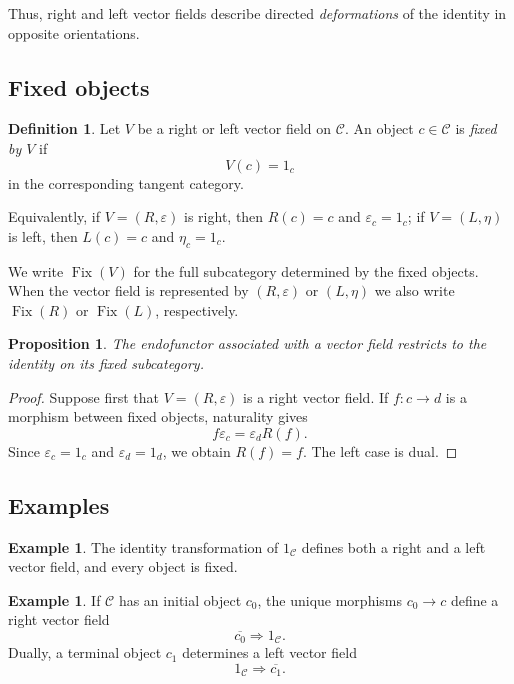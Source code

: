 \documentclass[12pt]{amsart}
\newtheorem{proposition}[teo]{Proposition}
\theoremstyle{definition}
\newtheorem{definition}[teo]{Definition}
\newtheorem{example}[teo]{Example}
\theoremstyle{remark}
\numberwithin{figure}{section}%
\newcommand{\CC}{\mathcal{C}}
\begin{document}
Thus, right and left vector fields describe directed \textit{deformations} of the
identity in opposite orientations.

\subsection{Fixed objects}
\label{subsec:fixed_objects}

\begin{definition}\label{def:fixed_object}
Let \(V\) be a right or left vector field on \(\CC\). An object
\(c\in\CC\) is \emph{fixed by \(V\)} if
\[
V(c)=1_c
\]
in the corresponding tangent category.

Equivalently, if \(V=(R,\varepsilon)\) is right, then
\(R(c)=c\) and \(\varepsilon_c=1_c\); if \(V=(L,\eta)\) is left, then
\(L(c)=c\) and \(\eta_c=1_c\).
\end{definition}

We write \(\operatorname{Fix}(V)\) for the full subcategory determined by
the fixed objects. When the vector field is represented by
\((R,\varepsilon)\) or \((L,\eta)\) we also write
\(\operatorname{Fix}(R)\) or \(\operatorname{Fix}(L)\), respectively.

\begin{proposition}\label{prop:fixed_subcategory}
The endofunctor associated with a vector field restricts to the identity
on its fixed subcategory.
\end{proposition}

\begin{proof}
Suppose first that \(V=(R,\varepsilon)\) is a right vector field. If
\(f\colon c\to d\) is a morphism between fixed objects, naturality gives
\[
f\varepsilon_c=\varepsilon_dR(f).
\]
Since \(\varepsilon_c=1_c\) and \(\varepsilon_d=1_d\), we obtain
\(R(f)=f\). The left case is dual.
\end{proof}

\subsection{Examples}

\begin{example}\label{ex:identity_vector_field}
The identity transformation of \(1_\CC\) defines both a right and a left
vector field, and every object is fixed.
\end{example}

\begin{example}\label{ex:initial_vector_field}
If \(\CC\) has an initial object \(c_0\), the unique morphisms
\(c_0\to c\) define a right vector field
\[
\overline{c_0}\Rightarrow1_\CC.
\]
Dually, a terminal object \(c_1\) determines a left vector field
\[
1_\CC\Rightarrow\overline{c_1}.
\]
\end{example}
\end{document}
